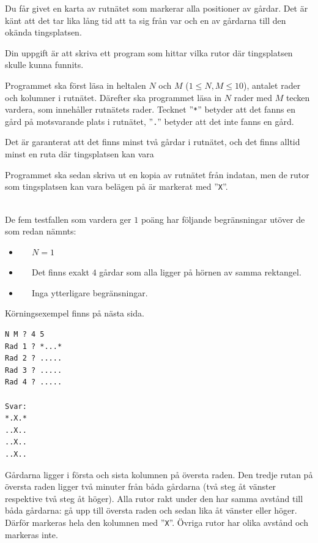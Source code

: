 Du får givet en karta av rutnätet som markerar alla positioner av gårdar. 
Det är känt att det tar lika lång tid att ta sig från var och en av gårdarna till den okända tingsplatsen. 

Din uppgift är att skriva ett program som hittar vilka rutor där tingsplatsen skulle kunna funnits.

Programmet ska först läsa in heltalen $N$ och $M$ ($1 \leq N,M \leq 10$), antalet rader och kolumner i rutnätet. 
Därefter ska programmet läsa in $N$ rader med $M$ tecken vardera, som innehåller rutnätets rader.
Tecknet ''\verb|*|'' betyder att det fanns en gård på motsvarande plats i rutnätet, 
''\verb|.|'' betyder att det inte fanns en gård.

Det är garanterat att det finns minst två gårdar i rutnätet, och det finns alltid minst en ruta där tingsplatsen kan vara


Programmet ska sedan skriva ut en kopia av rutnätet från indatan, men de rutor som tingsplatsen kan vara belägen på är markerat med ''\verb|X|''.

\vspace{0.5cm}
\\
De fem testfallen som vardera ger $1$ poäng har följande begränsningar utöver de som redan nämnts:
\begin{itemize}
    \item[(1)] $\;\;\;\;$ $N = 1$
    \item[(2)] $\;\;\;\;$ Det finns exakt $4$ gårdar som alla ligger på hörnen av samma rektangel.
    \item[(3-5)] $\;\;\;\;$ Inga ytterligare begränsningar.
\end{itemize}


\vspace{3cm}


\begin{center}
    {\LARGE Körningsexempel finns på nästa sida.}
\end{center}

\newpage

\vspace{0.4cm}
\vspace{-0.2cm}
\begin{verbatim}
N M ? 4 5
Rad 1 ? *...*
Rad 2 ? .....
Rad 3 ? .....
Rad 4 ? .....

Svar:
*.X.*
..X..
..X..
..X..
\end{verbatim}

Gårdarna ligger i första och sista kolumnen på översta raden. 
Den tredje rutan på översta raden ligger två minuter från båda gårdarna (två steg åt vänster respektive två steg åt höger). 
Alla rutor rakt under den har samma avstånd till båda gårdarna: gå upp till översta raden och sedan lika åt vänster eller höger. 
Därför markeras hela den kolumnen med ''\verb|X|''. Övriga rutor har olika avstånd och markeras inte.


